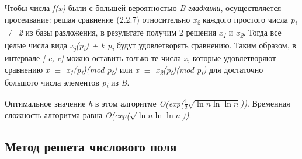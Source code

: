   Чтобы числа \textit{f(x)} были с большей вероятностью \textit{B-гладкими}, осуществляется просеивание: решая сравнение (2.2.7) относительно \textit{x\textsubscript{2}}
  каждого простого числа \textit{p\textsubscript{i} {$\ne$} 2} из базы разложения, в результате получим 2 решения \textit{x\textsubscript{1}} и \textit{x\textsubscript{2}}. 
  Тогда все целые числа вида \textit{x\textsubscript{j}(p\textsubscript{i}) + k p\textsubscript{i}} будут удовлетворять сравнению. Таким образом, в 
  интервале \textit{[-c, c]} можно оставить только те числа \textit{x}, которые удовлетворяют сравнению \textit{x {$\equiv$} x\textsubscript{1}(p\textsubscript{i})(mod p\textsubscript{i})} 
  или \textit{x {$\equiv$} x\textsubscript{2}(p\textsubscript{i})(mod p\textsubscript{i})} для достаточно большого числа элементов 
  \textit{p\textsubscript{i}} из \textit{B}.
  
  Оптимальное значение \textit{h} в этом алгоритме \textit{O(exp({$\frac{1}{2}$}{$\sqrt{\ln{n}\ln{\ln{n}}}$}))}. Временная сложность 
  алгоритма равна \textit{O(exp({$\sqrt{\ln{n}\ln{\ln{n}}}$}))}.

\subsection{Метод решета числового поля}